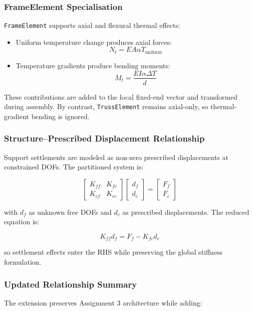 \subsubsection{FrameElement Specialisation}

\texttt{FrameElement} supports axial and flexural thermal effects:
\begin{itemize}
    \item Uniform temperature change produces axial forces:
    \[
    N_t = EA \alpha T_{\text{uniform}}
    \]
    \item Temperature gradients produce bending moments:
    \[
    M_t = \frac{EI \alpha \Delta T}{d}
    \]
\end{itemize}

These contributions are added to the local fixed-end vector and transformed during
assembly. By contrast, \texttt{TrussElement} remains axial-only, so thermal-gradient
bending is ignored.

\subsubsection{Structure--Prescribed Displacement Relationship}

Support settlements are modeled as non-zero prescribed displacements at constrained
DOFs. The partitioned system is:

\[
\begin{bmatrix}
K_{ff} & K_{fc} \\
K_{cf} & K_{cc}
\end{bmatrix}
\begin{bmatrix}
d_f \\
d_c
\end{bmatrix}
=
\begin{bmatrix}
F_f \\
F_c
\end{bmatrix}
\]

with $d_f$ as unknown free DOFs and $d_c$ as prescribed displacements. The reduced
equation is:

\[
K_{ff} d_f = F_f - K_{fc} d_c
\]

so settlement effects enter the RHS while preserving the global stiffness formulation.

\subsubsection{Updated Relationship Summary}

The extension preserves Assignment 3 architecture while adding:

